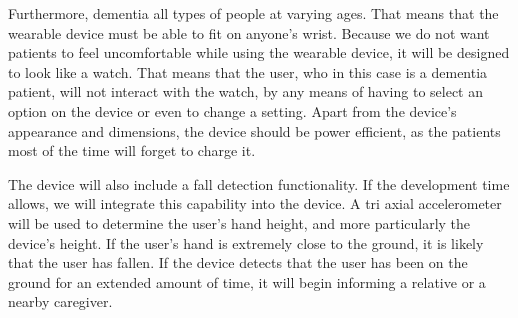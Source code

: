         Furthermore, dementia all types of people at varying ages. That means that the wearable device must be able to
        fit on anyone's wrist. Because we do not want patients to feel uncomfortable while using the wearable device, it
        will be designed to look like a watch. That means that the user, who in this case is a dementia patient, will
        not interact with the watch, by any means of having to select an option on the device or even to change a
        setting. Apart from the device's appearance and dimensions, the device should be power efficient, as the
        patients most of the time will forget to charge it.

        The device will also include a fall detection functionality. If the development time allows, we will integrate
        this capability into the device. A tri axial accelerometer will be used to determine the user's hand height, and
        more particularly the device's height. If the user's hand is extremely close to the ground, it is likely that
        the user has fallen. If the device detects that the user has been on the ground for an extended amount of time,
        it will begin informing a relative or a nearby caregiver.
